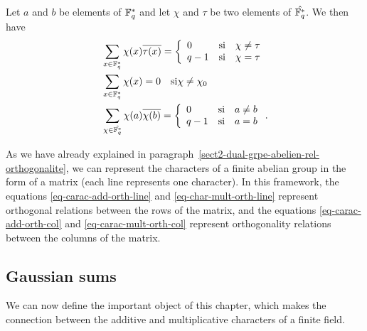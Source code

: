  
\begin{prop}
Let $ a $ and $ b $ be elements of $ \mathbb{F}_q^* $ and let $ \chi $ and $ \tau $ be two elements of $ \hat{\mathbb{F}_q^*} $. We then have
\begin{align}
\label{eq-char-mult-orth-line}
& \sum_{x \in \mathbb{F}_q^*}{\chi (x) \overline{\tau (x)}} = \left\{\begin{array}{lll} 0 & \text{si} & \chi \neq \tau \\q-1 & \text{si} & \chi = \tau \end{array} \right. \\
\label{eq-carac-mult-sum}
& \sum_{x \in \mathbb{F}_q^*}{\chi (x)} = 0 \quad \text{si} \chi \neq \chi_0 \\
\label{eq-carac-mult-orth-col}
& \sum_{\chi \in \hat{\mathbb{F}_q^*}}{\chi (a) \overline{\chi (b)}} = \left\{\begin{array}{lll} 0 & \text{si} & a \neq b \\q-1 & \text{si} & a = b \end{array} \right. .
\end{align}
\end{prop}
 
 
\begin{rem}
 As we have already explained in paragraph~\ref{sect2-dual-grpe-abelien-rel-orthogonalite}, we can represent the characters of a finite abelian group in the form of a matrix (each line represents one character). In this framework, the equations \eqref{eq-carac-add-orth-line} and \eqref{eq-char-mult-orth-line} represent orthogonal relations between the rows of the matrix, and the equations \eqref{eq-carac-add-orth-col} and \eqref{eq-carac-mult-orth-col} represent orthogonality relations between the columns of the matrix.
\end{rem}
 
\subsection{Gaussian sums}
\label{sect2-are-gauss} 
 
 
We can now define the important object of this chapter, which makes the connection between the additive and multiplicative characters of a finite field.
 

